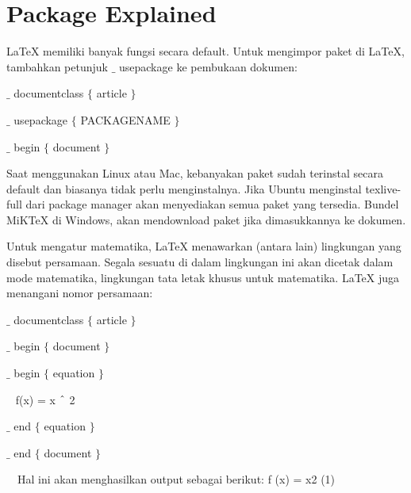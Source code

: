 \section{Package Explained}
\hspace{0.50in} LaTeX memiliki banyak fungsi secara default. Untuk mengimpor paket di LaTeX, tambahkan petunjuk  $ \_ $  usepackage ke pembukaan dokumen:\par

\noindent  $ \_ $ documentclass $ \{ $ article $ \} $ \par
\noindent  $ \_ $ usepackage $ \{ $ PACKAGENAME $ \} $ \par
\noindent  $ \_ $ begin $ \{ $ document $ \} $ \par

\vspace{12pt}
\hspace{0.50in} Saat menggunakan Linux atau Mac, kebanyakan paket sudah terinstal secara default dan biasanya tidak perlu menginstalnya. Jika Ubuntu menginstal texlive-full dari package manager akan menyediakan semua paket yang tersedia. Bundel MiKTeX di Windows, akan mendownload paket jika dimasukkannya ke dokumen.\par
\hspace{0.50in} Untuk mengatur matematika, LaTeX menawarkan (antara lain) lingkungan yang disebut persamaan. Segala sesuatu di dalam lingkungan ini akan dicetak dalam mode matematika, lingkungan tata letak khusus untuk matematika. LaTeX juga menangani nomor persamaan:\par

{\fontsize{10pt}{10pt}\selectfont  $ \_ $ documentclass $ \{ $ article $ \} $ }\par

{\fontsize{10pt}{10pt}\selectfont  $ \_ $ begin $ \{ $ document $ \} $ }\par

{\fontsize{10pt}{10pt}\selectfont  $ \_ $ begin $ \{ $ equation $ \} $ }\par

{\fontsize{10pt}{10pt}\selectfont ~ f(x) = x $ \string^ $ 2}\par

{\fontsize{10pt}{10pt}\selectfont  $ \_ $ end $ \{ $ equation $ \} $ }\par

{\fontsize{10pt}{10pt}\selectfont  $ \_ $ end $ \{ $ document $ \} $ }\par
~~\noindent Hal ini akan menghasilkan output sebagai berikut: f (x) = x2 (1)\par

